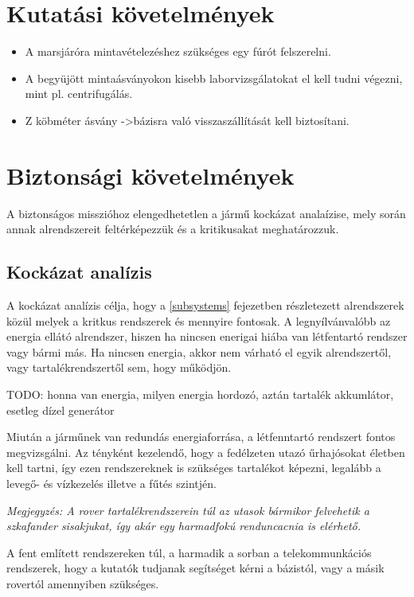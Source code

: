 \documentclass[12pt]{report}
\begin{document}
\section{Kutatási követelmények}
\begin{itemize}
  \item A marsjáróra mintavételezéshez szükséges egy fúrót felszerelni.
  \item A begyüjött mintaásványokon kisebb laborvizsgálatokat el kell tudni végezni, mint pl. centrifugálás.
  \item Z köbméter ásvány ->bázisra való visszaszállítását kell biztosítani.
\end{itemize}
\section{Biztonsági követelmények}

A biztonságos misszióhoz elengedhetetlen a jármű kockázat analaízise, mely során annak alrendszereit feltérképezzük és a kritikusakat meghatározzuk. 

\subsection{Kockázat analízis}



A kockázat analízis célja, hogy a \ref{subsystems} fejezetben részletezett alrendszerek közül melyek a kritkus rendszerek és mennyire fontosak. A legnyílvánvalóbb az energia ellátó alrendszer, hiszen ha nincsen enerigai hiába van létfentartó rendszer vagy bármi más. Ha nincsen energia, akkor nem várható el egyik alrendszertől, vagy tartalékrendszertől sem, hogy működjön.

TODO: honna van energia, milyen energia hordozó, aztán tartalék akkumlátor, esetleg dízel generátor

Miután a járműnek van redundás energiaforrása, a létfenntartó rendszert fontos megvizsgálni. Az tényként kezelendő, hogy a fedélzeten utazó űrhajósokat életben kell tartni, így ezen rendszereknek is szükséges tartalékot képezni, legalább a levegő- és vízkezelés illetve a fűtés szintjén. 

\textit{Megjegyzés: A rover tartalékrendszerein túl az utasok bármikor felvehetik a szkafander sisakjukat, így akár egy harmadfokú renduncacnia is elérhető.}

A fent említett rendszereken túl, a harmadik a sorban a telekommunkációs rendszerek, hogy a kutatók tudjanak segítséget kérni a bázistól, vagy a másik rovertól amennyiben szükséges.
\end{document}
